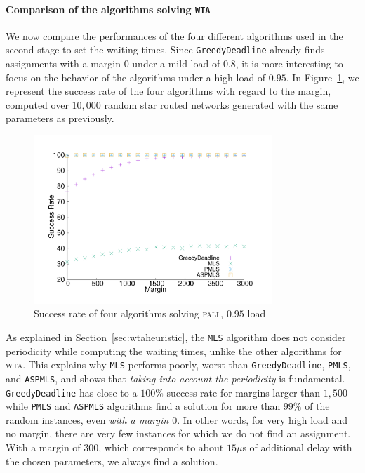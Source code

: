 \documentclass[a4paper,10pt]{journal}
\newcommand\greedydeadline{\texttt{GreedyDeadline}\xspace}
\newcommand\MLS{\texttt{MLS}\xspace}
\newcommand\PMLS{\texttt{PMLS}\xspace}
\newcommand\ASPMLS{\texttt{ASPMLS}\xspace}
\newcommand\pall{\textsc{pall}\xspace}
\newcommand\wta{\textsc{wta}\xspace}
\begin{document}
 \paragraph{Comparison of the algorithms solving \texttt{WTA}}

We now compare the performances of the four different algorithms used in the second stage to set the waiting times. Since \greedydeadline already finds assignments with a margin $0$ under a mild load of $0.8$, it is more interesting to focus on the behavior of the algorithms under a high load of $0.95$. In Figure~\ref{fig:success21000}, we represent the success rate of the four algorithms with regard to the margin, computed over $10,000$ random star routed networks generated with the same parameters as previously.

\begin{figure} [h]
\begin{center}
\includegraphics[width=0.8\textwidth]{retour_21000.pdf}
\end{center}
\caption{Success rate of four algorithms solving \pall, $0.95$ load}
\label{fig:success21000}
\end{figure}

As explained in Section~\ref{sec:wtaheuristic}, the \MLS algorithm does not consider periodicity while computing the waiting times, unlike the other algorithms for \wta. This explains why \MLS performs poorly, worst than \greedydeadline, \PMLS, and \ASPMLS, and shows that \emph{taking into account the periodicity} is fundamental.
\greedydeadline has close to a $100\%$ success rate for margins larger than $1,500$ while \PMLS and \ASPMLS algorithms find a solution for more than $99\%$ of the random instances, even \emph{with a margin $0$}. In other words, for very high load and no margin, there are very few instances for which we do not find an assignment. With a margin of $300$, which corresponds to about $15\mu$s of additional delay with the chosen parameters, we always find a solution.
\end{document}
